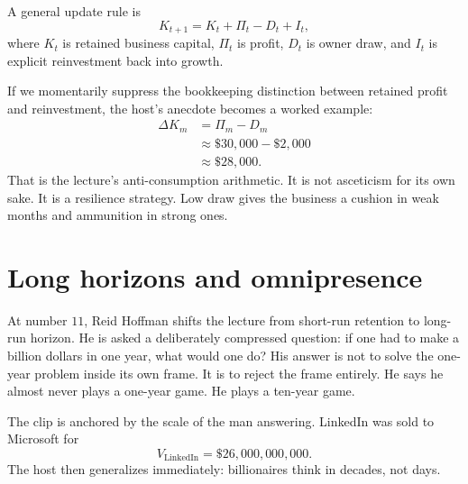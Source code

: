 A general update rule is
\begin{equation}
K_{t+1} = K_t + \Pi_t - D_t + I_t,
\end{equation}
where \(K_t\) is retained business capital, \(\Pi_t\) is profit, \(D_t\) is owner draw, and \(I_t\) is explicit reinvestment back into growth.

If we momentarily suppress the bookkeeping distinction between retained profit and reinvestment, the host's anecdote becomes a worked example:
\begin{align}
\Delta K_m &= \Pi_m - D_m \\
&\approx \$30{,}000 - \$2{,}000 \\
&\approx \$28{,}000.
\end{align}
That is the lecture's anti-consumption arithmetic. It is not asceticism for its own sake. It is a resilience strategy. Low draw gives the business a cushion in weak months and ammunition in strong ones.

\begin{figure}[h]
\centering
{}
\end{figure}

\section{Long horizons and omnipresence}

At number \(11\), Reid Hoffman shifts the lecture from short-run retention to long-run horizon. He is asked a deliberately compressed question: if one had to make a billion dollars in one year, what would one do? His answer is not to solve the one-year problem inside its own frame. It is to reject the frame entirely. He says he almost never plays a one-year game. He plays a ten-year game.

The clip is anchored by the scale of the man answering. LinkedIn was sold to Microsoft for
\begin{equation}
V_{\mathrm{LinkedIn}} = \$26{,}000{,}000{,}000.
\end{equation}
The host then generalizes immediately: billionaires think in decades, not days.

